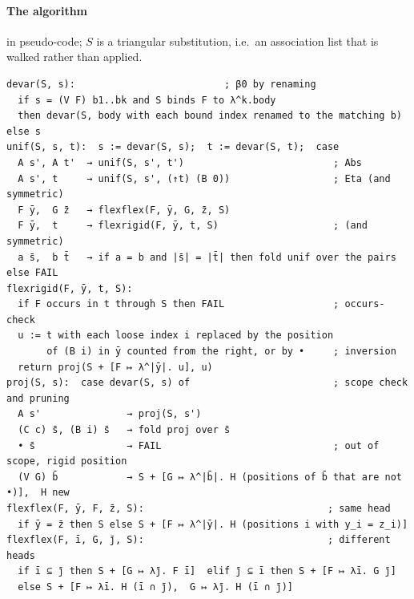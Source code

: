 \paragraph{The algorithm} in pseudo-code; $S$ is a triangular substitution, i.e.\ an association list that is
walked rather than applied.
\begin{Verbatim}[fontsize=\footnotesize,xrightmargin=-\overhang]
devar(S, s):                          ; β0 by renaming
  if s = (V F) b1..bk and S binds F to λ^k.body
  then devar(S, body with each bound index renamed to the matching b)  else s
unif(S, s, t):  s := devar(S, s);  t := devar(S, t);  case
  A s', A t'  → unif(S, s', t')                          ; Abs
  A s', t     → unif(S, s', (↑t) (B 0))                  ; Eta (and symmetric)
  F ȳ,  G z̄   → flexflex(F, ȳ, G, z̄, S)
  F ȳ,  t     → flexrigid(F, ȳ, t, S)                    ; (and symmetric)
  a s̄,  b t̄   → if a = b and |s̄| = |t̄| then fold unif over the pairs else FAIL
flexrigid(F, ȳ, t, S):
  if F occurs in t through S then FAIL                   ; occurs-check
  u := t with each loose index i replaced by the position
       of (B i) in ȳ counted from the right, or by •     ; inversion
  return proj(S + [F ↦ λ^|ȳ|. u], u)
proj(S, s):  case devar(S, s) of                         ; scope check and pruning
  A s'               → proj(S, s')
  (C c) s̄, (B i) s̄   → fold proj over s̄
  • s̄                → FAIL                              ; out of scope, rigid position
  (V G) b̄            → S + [G ↦ λ^|b̄|. H (positions of b̄ that are not •)],  H new
flexflex(F, ȳ, F, z̄, S):                                ; same head
  if ȳ = z̄ then S else S + [F ↦ λ^|ȳ|. H (positions i with y_i = z_i)]
flexflex(F, ī, G, j̄, S):                                ; different heads
  if ī ⊆ j̄ then S + [G ↦ λj̄. F ī]  elif j̄ ⊆ ī then S + [F ↦ λī. G j̄]
  else S + [F ↦ λī. H (ī ∩ j̄),  G ↦ λj̄. H (ī ∩ j̄)]
\end{Verbatim}

